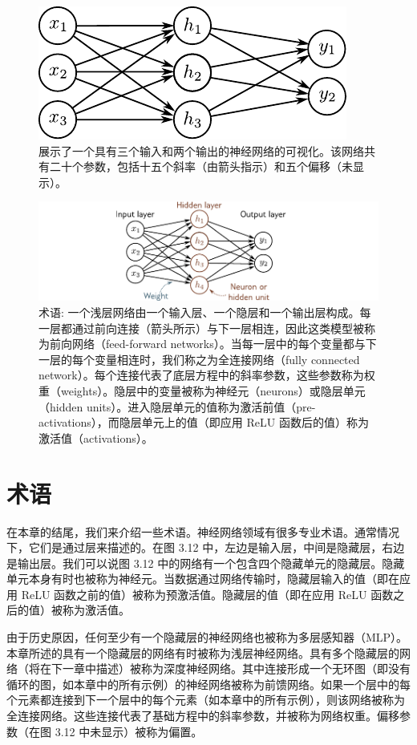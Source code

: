\documentclass[lang=cn,newtx,10pt,scheme=chinese]{elegantbook}
\begin{document}
\begin{figure}[ht!]
	\centering
	\includegraphics[width=0.7\linewidth]{PDFFigures/UDLChap3PDF/ShallowNetThreeInputsTwoOutputs.pdf}
\caption{展示了一个具有三个输入和两个输出的神经网络的可视化。该网络共有二十个参数，包括十五个斜率（由箭头指示）和五个偏移（未显示）。}
\end{figure}

\begin{figure}[ht!]
	\centering
	\includegraphics[width=0.7\linewidth]{PDFFigures/UDLChap3PDF/ShallowTerminology.pdf}
\caption{术语: 一个浅层网络由一个输入层、一个隐层和一个输出层构成。每一层都通过前向连接（箭头所示）与下一层相连，因此这类模型被称为前向网络（feed-forward networks）。当每一层中的每个变量都与下一层的每个变量相连时，我们称之为全连接网络（fully connected network）。每个连接代表了底层方程中的斜率参数，这些参数称为权重（weights）。隐层中的变量被称为神经元（neurons）或隐层单元（hidden units）。进入隐层单元的值称为激活前值（pre-activations），而隐层单元上的值（即应用 ReLU 函数后的值）称为激活值（activations）。}
\end{figure}

\section{术语}
在本章的结尾，我们来介绍一些术语。神经网络领域有很多专业术语。通常情况下，它们是通过层来描述的。在图 3.12 中，左边是输入层，中间是隐藏层，右边是输出层。我们可以说图 3.12 中的网络有一个包含四个隐藏单元的隐藏层。隐藏单元本身有时也被称为神经元。当数据通过网络传输时，隐藏层输入的值（即在应用 ReLU 函数之前的值）被称为预激活值。隐藏层的值（即在应用 ReLU 函数之后的值）被称为激活值。

由于历史原因，任何至少有一个隐藏层的神经网络也被称为多层感知器（MLP）。本章所述的具有一个隐藏层的网络有时被称为浅层神经网络。具有多个隐藏层的网络（将在下一章中描述）被称为深度神经网络。其中连接形成一个无环图（即没有循环的图，如本章中的所有示例）的神经网络被称为前馈网络。如果一个层中的每个元素都连接到下一个层中的每个元素（如本章中的所有示例），则该网络被称为全连接网络。这些连接代表了基础方程中的斜率参数，并被称为网络权重。偏移参数（在图 3.12 中未显示）被称为偏置。
\end{document}
